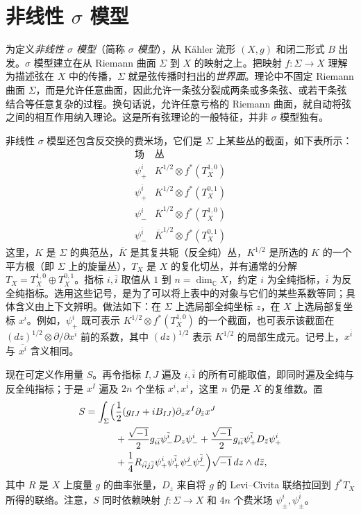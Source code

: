 \section{非线性 \texorpdfstring{$\sigma$}{σ} 模型}\label{sec:nonlinear-sigma-models}
为定义\emph{非线性 $\sigma$ 模型}（简称 \emph{$\sigma$ 模型}），从 Kähler 流形 $(X,g)$ 和闭二形式 $B$ 出发。$\sigma$ 模型建立在从 Riemann 曲面 $\Sigma$ 到 $X$ 的映射之上。把映射 $f:\Sigma\to X$ 理解为描述弦在 $X$ 中的传播，$\Sigma$ 就是弦传播时扫出的\emph{世界面}。理论中不固定 Riemann 曲面 $\Sigma$，而是允许任意曲面，因此允许一条弦分裂成两条或多条弦、或若干条弦结合等任意复杂的过程。换句话说，允许任意亏格的 Riemann 曲面，就自动将弦之间的相互作用纳入理论。这是所有弦理论的一般特征，并非 $\sigma$ 模型独有。

非线性 $\sigma$ 模型还包含反交换的费米场，它们是 $\Sigma$ 上某些丛的截面，如下表所示：
\begin{equation}\label{eq:sigma-model-fermionic-bundles}
\begin{array}{c|l}
\text{场}&\text{丛}\\\hline
\psi_+^i&K^{1/2}\otimes f^*(T_X^{1,0})\\
\psi_+^{\bar i}&K^{1/2}\otimes f^*(T_X^{0,1})\\
\psi_-^i&\overline K^{1/2}\otimes f^*(T_X^{1,0})\\
\psi_-^{\bar i}&\overline K^{1/2}\otimes f^*(T_X^{0,1})
\end{array}
\end{equation}
这里，$K$ 是 $\Sigma$ 的典范丛，$\overline K$ 是其复共轭（反全纯）丛，$K^{1/2}$ 是所选的 $K$ 的一个平方根（即 $\Sigma$ 上的旋量丛），$T_X$
是 $X$ 的复化切丛，并有通常的分解 $T_X=T_X^{1,0}\oplus T_X^{0,1}$。指标 $i,\bar i$ 取值从 $1$ 到 $n=\dim_{\mathbb C}X$，约定 $i$ 为全纯指标，$\bar i$ 为反全纯指标。选用这些记号，是为了可以将上表中的对象与它们的某些系数等同；具体含义由上下文辨明。做法如下：在 $\Sigma$ 上选局部全纯坐标 $z$，在 $X$ 上选局部复坐标 $x^i$。例如，$\psi_+^i$ 既可表示 $K^{1/2}\otimes f^*(T_X^{1,0})$ 的一个截面，也可表示该截面在 $(dz)^{1/2}\otimes\partial/\partial x^i$ 前的系数，其中 $(dz)^{1/2}$ 表示 $K^{1/2}$ 的局部生成元。记号上，$x^{\bar i}$ 与 $\overline{x^i}$ 含义相同。

现在可定义作用量 $S$。再令指标 $I,J$ 遍及 $i,\bar i$ 的所有可能取值，即同时遍及全纯与反全纯指标；于是 $x^I$ 遍及 $2n$ 个坐标 $x^i,x^{\bar i}$，这里 $n$ 仍是 $X$ 的复维数。置
\begin{equation}\label{eq:supersymmetric-sigma-action}
\begin{aligned}
S=\int_\Sigma\Bigl(&\frac12(g_{IJ}+iB_{IJ})\partial_zx^I\partial_{\bar z}x^J\\
&+\frac{\sqrt{-1}}2g_{i\bar i}\psi_-^{\bar i}D_z\psi_-^i
+\frac{\sqrt{-1}}2g_{i\bar i}\psi_+^{\bar i}D_{\bar z}\psi_+^i\\
&+\frac14R_{i\bar i j\bar j}\psi_+^i\psi_+^{\bar i}\psi_-^j\psi_-^{\bar j}\Bigr)
\sqrt{-1}\,dz\wedge d\bar z,
\end{aligned}
\end{equation}
其中 $R$ 是 $X$ 上度量 $g$ 的曲率张量，$D_z$ 来自将 $g$ 的 Levi--Civita 联络拉回到 $f^*T_X$ 所得的联络。注意，$S$ 同时依赖映射 $f:\Sigma\to X$ 和 $4n$ 个费米场 $\psi_\pm^i,\psi_\pm^{\bar i}$。

